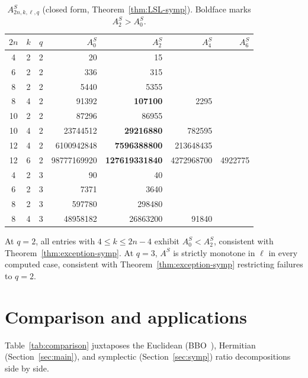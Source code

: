 \documentclass[11pt]{article}
\theoremstyle{plain}
\theoremstyle{remark}
\begin{document}
\begin{table}[h]
\centering
\caption{$A^S_{2n,k,\ell,q}$ (closed form, Theorem~\ref{thm:LSL-symp}).
Boldface marks $A^S_2 > A^S_0$.}
\label{tab:symplectic-A}
\begin{tabular}{ccc|rrrr}
\toprule
$2n$ & $k$ & $q$ & $A^S_0$ & $A^S_2$ & $A^S_4$ & $A^S_6$ \\
\midrule
4 & 2 & 2 & 20 & 15 & & \\
6 & 2 & 2 & 336 & 315 & & \\
8 & 2 & 2 & 5440 & 5355 & & \\
8 & 4 & 2 & 91392 & \textbf{107100} & 2295 & \\
10 & 2 & 2 & 87296 & 86955 & & \\
10 & 4 & 2 & 23744512 & \textbf{29216880} & 782595 & \\
12 & 4 & 2 & 6100942848 & \textbf{7596388800} & 213648435 & \\
12 & 6 & 2 & 98777169920 & \textbf{127619331840} & 4272968700 & 4922775 \\
\midrule
4 & 2 & 3 & 90 & 40 & & \\
6 & 2 & 3 & 7371 & 3640 & & \\
8 & 2 & 3 & 597780 & 298480 & & \\
8 & 4 & 3 & 48958182 & 26863200 & 91840 & \\
\bottomrule
\end{tabular}
\end{table}

At $q = 2$, all entries with $4 \leq k \leq 2n - 4$ exhibit
$A^S_0 < A^S_2$, consistent with Theorem~\ref{thm:exception-symp}.
At $q = 3$, $A^S$ is strictly monotone in $\ell$ in every computed case,
consistent with Theorem~\ref{thm:exception-symp} restricting failures to $q = 2$.

\section{Comparison and applications}\label{sec:comp-app}

Table~\ref{tab:comparison} juxtaposes the Euclidean (BBO~\cite{BBOz2026}),
Hermitian (Section~\ref{sec:main}), and symplectic (Section~\ref{sec:symp}) ratio
decompositions side by side.
\end{document}
